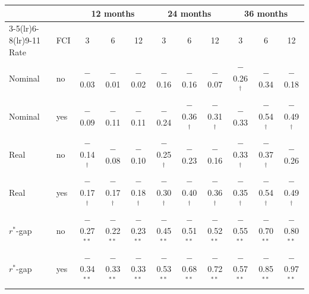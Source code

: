 \begin{tabular}{llccccccccc}
\toprule
 & & \multicolumn{3}{c}{12 months} & \multicolumn{3}{c}{24 months} & \multicolumn{3}{c}{36 months}\\
\cmidrule(lr){3-5}\cmidrule(lr){6-8}\cmidrule(lr){9-11}
Rate & FCI & 3 & 6 & 12 & 3 & 6 & 12 & 3 & 6 & 12 \\
\midrule
Nominal & no & $-$0.03 & $-$0.01 & $-$0.02 & $-$0.16 & $-$0.16 & $-$0.07 & $-$0.26$^{\dagger}$ & $-$0.34 & $-$0.18 \\
Nominal & yes & $-$0.09 & $-$0.11 & $-$0.11 & $-$0.24 & $-$0.36$^{\dagger}$ & $-$0.31$^{\dagger}$ & $-$0.33 & $-$0.54$^{\dagger}$ & $-$0.49$^{\dagger}$ \\
\midrule
Real & no & $-$0.14$^{\dagger}$ & $-$0.08 & $-$0.10 & $-$0.25$^{\dagger}$ & $-$0.23 & $-$0.16 & $-$0.33$^{\dagger}$ & $-$0.37$^{\dagger}$ & $-$0.26 \\
Real & yes & $-$0.17$^{\dagger}$ & $-$0.17$^{\dagger}$ & $-$0.18$^{\dagger}$ & $-$0.30$^{\dagger}$ & $-$0.40$^{\dagger}$ & $-$0.36$^{\dagger}$ & $-$0.35$^{\dagger}$ & $-$0.54$^{\dagger}$ & $-$0.49$^{\dagger}$ \\
\midrule
$r^*$-gap & no & $-$0.27$^{**}$ & $-$0.22$^{**}$ & $-$0.23$^{**}$ & $-$0.45$^{**}$ & $-$0.51$^{**}$ & $-$0.52$^{**}$ & $-$0.55$^{**}$ & $-$0.70$^{**}$ & $-$0.80$^{**}$ \\
$r^*$-gap & yes & $-$0.34$^{**}$ & $-$0.33$^{**}$ & $-$0.33$^{**}$ & $-$0.53$^{**}$ & $-$0.68$^{**}$ & $-$0.72$^{**}$ & $-$0.57$^{**}$ & $-$0.85$^{**}$ & $-$0.97$^{**}$ \\
\bottomrule
\end{tabular}
